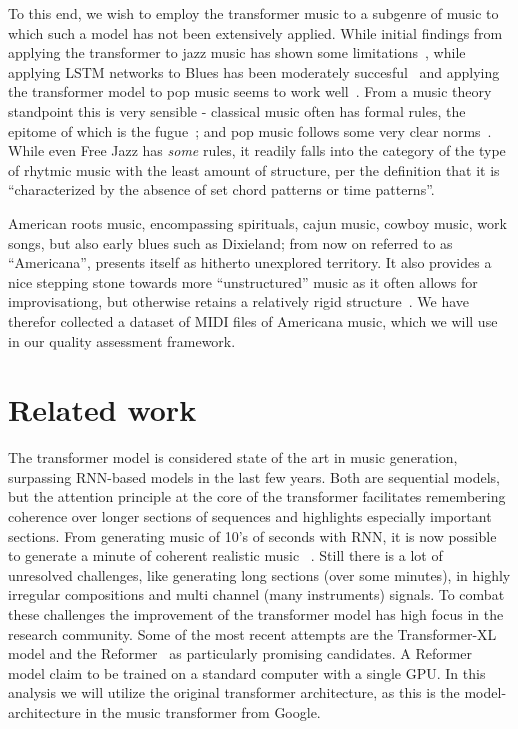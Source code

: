 \documentclass{IEEEtran}
\begin{document}
        To this end, we wish to employ the transformer music to a subgenre of music   
        to which such a model has not been extensively applied.
        While initial findings from applying the transformer to jazz music has shown 
        some limitations~\cite{wu2020jazz}, while applying LSTM networks to Blues has 
        been moderately succesful~\cite{eck2002bluesLSTM} and applying the transformer 
        model to pop music seems to work well~\cite{huang2020pop}.
        From a music theory standpoint this is very sensible - classical music often has 
        formal rules, the epitome of which is the fugue~\cite{giraud2015computational};
        and pop music follows some very clear norms~\cite{hennion1983production}. While 
        even Free Jazz has \emph{some} rules, it readily falls into the category of the 
        type of rhytmic music with the least amount of structure, per the definition
        that it is ``characterized by the absence of set chord patterns or
        time patterns''\cite{FreeJazz}.

        American roots music, encompassing spirituals, cajun music, cowboy music, work songs,
        but also early blues such as Dixieland; from now on referred to as ``Americana'', presents 
        itself as hitherto unexplored territory. It also provides a nice stepping stone
        towards more ``unstructured'' music as it often allows for improvisationg, but 
        otherwise retains a relatively rigid structure~\cite{libcong}.
        We have therefor collected a dataset of MIDI files of Americana music, which we
        will use in our quality assessment framework.

    \section{Related work}
       The transformer model is considered state of the art in music generation,
       surpassing RNN-based models in the last few years. Both are sequential models,
       but the attention principle at the core of the transformer facilitates
       remembering coherence over longer sections of sequences and highlights
       especially important sections. From generating music of 10's of seconds with RNN, it is now possible to generate a minute of coherent realistic music ~\cite{huang2018music}. Still there is a lot of unresolved challenges, like generating long sections (over some minutes), in highly irregular compositions
       and multi channel (many instruments) signals. To combat these challenges the
       improvement of the transformer model has high focus in the research community.
       Some of the most recent attempts are the Transformer-XL~\cite{dai2019transformerxl} 
       model and the Reformer~\cite{kitaev2020reformer} as particularly promising
       candidates.
       A Reformer model claim to be trained on a standard computer with a single GPU.
       In this analysis we will utilize the original transformer architecture, as this
       is the model-architecture in the music transformer from Google.
\end{document}
